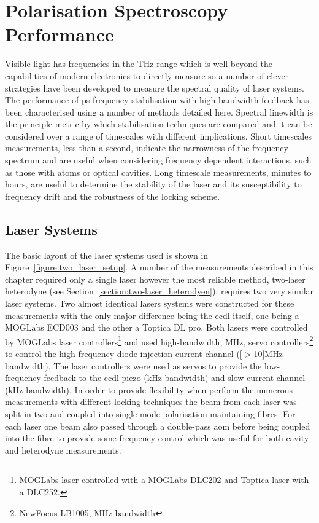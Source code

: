 \section{Polarisation Spectroscopy Performance}
Visible light has frequencies in the THz range which is well beyond the capabilities of modern electronics to directly measure so a number of clever strategies have been developed to measure the spectral quality of laser systems.
The performance of \gls*{ps} frequency stabilisation with high-bandwidth feedback has been characterised using a number of methods detailed here.
Spectral linewidth is the principle metric by which stabilisation techniques are compared and it can be considered over a range of timescales with different implications.
Short timescales measurements, less than a second, indicate the narrowness of the frequency spectrum and are useful when considering frequency dependent interactions, such as those with atoms or optical cavities.
Long timescale measurements, minutes to hours, are useful to determine the stability of the laser and its susceptibility to frequency drift and the robustness of the locking scheme.

\subsection{Laser Systems}\label{section:ps_experimental_setup}

The basic layout of the laser systems used is shown in Figure~\ref{figure:two_laser_setup}.
A number of the measurements described in this chapter required only a single laser however the most reliable method, two-laser heterodyne (see Section~\ref{section:two-laser_heterodyen}), requires two very similar laser systems.
Two almost identical lasers systems were constructed for these measurements with the only major difference being the \gls{ecdl} itself, one being a MOGLabs ECD003 and the other a Toptica DL pro.
Both lasers were controlled by MOGLabs laser controllers\footnote{MOGLabs laser controlled with a MOGLabs DLC202 and Toptica laser with a DLC252.} and used high-bandwidth, \unit[14]{MHz}, servo controllers\footnote{NewFocus LB1005, \unit[14]{MHz} bandwidth} to control the high-frequency diode injection current channel (\unit[$>$10]{MHz} bandwidth).
The laser controllers were used as servos to provide the low-frequency feedback to the \gls{ecdl} piezo (\unit[1]{kHz} bandwidth) and slow current channel (\unit[50]{kHz} bandwidth).
In order to provide flexibility when perform the numerous measurements with different locking techniques the beam from each laser was split in two and coupled into single-mode polarisation-maintaining fibres.
For each laser one beam also passed through a double-pass \gls{aom} before being coupled into the fibre to provide some frequency control which was useful for both cavity and heterodyne measurements.

